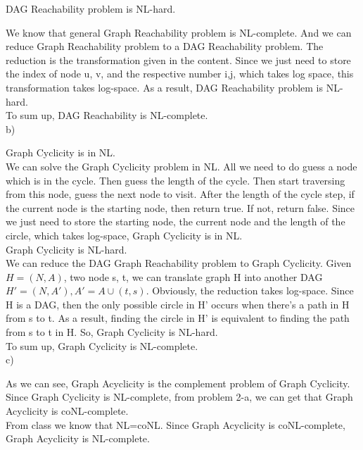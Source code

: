 \documentclass[12pt]{article}
\begin{document}
DAG Reachability problem is NL-hard.

We know that general Graph Reachability problem is NL-complete. And we
can reduce Graph Reachability problem to a DAG Reachability
problem. The reduction is the transformation given in the
content. Since we just need to store the index of node u, v, and the
respective number i,j, which takes log space, this transformation
takes log-space. As a result, DAG Reachability problem is NL-hard. \\

To sum up, DAG Reachability is NL-complete. \\

b)

Graph Cyclicity is in NL. \\

We can solve the Graph Cyclicity problem in NL. All we need to do
guess a node which is in the cycle. Then guess the length of the
cycle. Then start traversing from this node, guess the next node
to visit. After the length of the cycle step, if the current node is
the starting node, then return true. If not, return false. Since we
just need to store the starting node, the current node and the length
of the circle, which takes log-space, Graph Cyclicity is in NL. \\

Graph Cyclicity is NL-hard. \\

We can reduce the DAG Graph Reachability problem to Graph
Cyclicity. Given $H = (N,A)$, two node s, t, we can translate graph H
into another DAG $H' = (N, A'), A' = A \cup {(t,s)}$. Obviously, the
reduction takes log-space. Since H is a DAG, then the only possible
circle in H' occurs when there's a path in H from s to t. As a result,
finding the circle in H' is equivalent to finding the path from s to t
in H. So, Graph Cyclicity is NL-hard. \\

To sum up, Graph Cyclicity is NL-complete. \\

c)

As we can see, Graph Acyclicity is the complement problem of Graph
Cyclicity. Since Graph Cyclicity is NL-complete, from problem 2-a, we
can get that Graph Acyclicity is coNL-complete. \\

From class we know that NL=coNL. Since Graph Acyclicity is
coNL-complete, Graph Acyclicity is NL-complete. \\
\end{document}
